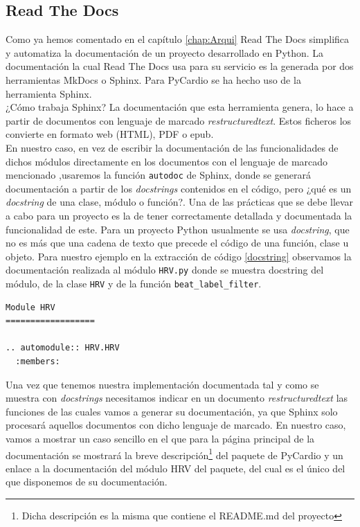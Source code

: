 \subsection*{Read The Docs}
\label{subusub:rtd}
Como ya hemos comentado en el capítulo \ref{chap:Arqui} Read The Docs simplifica y automatiza la documentación de un proyecto desarrollado en Python. La documentación la cual Read The Docs usa para su servicio es la generada por dos herramientas MkDocs o Sphinx. Para PyCardio se ha hecho uso de la herramienta Sphinx. \\
¿Cómo trabaja Sphinx? La documentación que esta herramienta genera, lo hace a partir de documentos con lenguaje de marcado \textit{restructuredtext}. Estos ficheros los convierte en formato web (HTML), PDF o epub. \\
En nuestro caso, en vez de escribir la documentación de las funcionalidades de dichos módulos directamente en los documentos con el lenguaje de marcado mencionado ,usaremos la función \texttt{autodoc} de Sphinx, donde se generará documentación a partir de los \textit{docstrings} contenidos en el código, pero ¿qué es un \textit{docstring} de una clase, módulo o función?. Una de las prácticas que se debe llevar a cabo para un proyecto es la de tener correctamente detallada y documentada la funcionalidad de este. Para un proyecto Python usualmente se usa \textit{docstring}, que no es más que una cadena de texto que precede el código de una función, clase u objeto. Para nuestro ejemplo en la extracción de código \ref{docstring} observamos la documentación realizada al módulo \texttt{HRV.py} donde se muestra docstring del módulo, de la clase \texttt{HRV} y de la función \texttt{beat\_label\_filter}. \\
\begin{lstlisting}[caption=\texttt{HRV.rst},label=hrv]
Module HRV
==================

.. automodule:: HRV.HRV
  :members:

\end{lstlisting}

Una vez que tenemos nuestra implementación documentada tal y como se muestra con \textit{docstrings} necesitamos indicar en un documento \textit{restructuredtext} las funciones de las cuales vamos a generar su documentación, ya que Sphinx solo procesará aquellos documentos con dicho lenguaje de marcado. En nuestro caso, vamos a mostrar un caso sencillo en el que para la página principal de la documentación se mostrará la breve descripción\footnote{Dicha descripción es la misma que contiene el README.md del proyecto} del paquete de PyCardio y un enlace a la documentación del módulo HRV del paquete, del cual es el único del que disponemos de su documentación. \\

